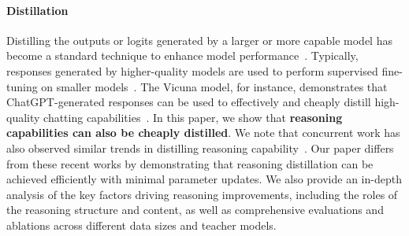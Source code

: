 
\paragraph{Distillation}
Distilling the outputs or logits generated by a larger or more capable model has become a standard technique to enhance model performance~\citep{hinton2015distilling}.  Typically, responses generated by higher-quality models are used to perform supervised fine-tuning on smaller models~\citep{lambert2024t}. 
The Vicuna model, for instance, demonstrates that ChatGPT-generated responses can be used to effectively and cheaply distill high-quality chatting capabilities~\citep{zheng2023judging}. In this paper, we show that \textbf{reasoning capabilities can also be cheaply distilled}. We note that concurrent work has also observed similar trends in distilling reasoning capability~\citep{min2024imitate, huang2024o1}. 
Our paper differs from these recent works by demonstrating that reasoning distillation can be achieved efficiently with minimal parameter updates. We also provide an in-depth analysis of the key factors driving reasoning improvements, including the roles of the reasoning structure and content, as well as comprehensive evaluations and ablations across different data sizes and teacher models.

